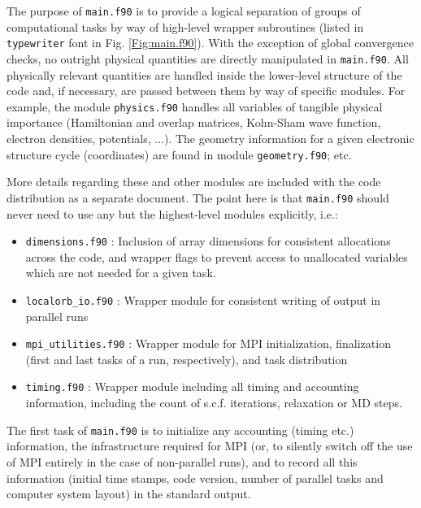 The purpose of \texttt{main.f90} is to provide a logical separation of
groups of computational tasks by way of high-level wrapper subroutines
(listed in \texttt{typewriter} font in Fig. \ref{Fig:main.f90}). With
the exception of global convergence checks, no outright physical
quantities are directly manipulated in \texttt{main.f90}. All
physically relevant quantities are handled inside the lower-level
structure of the code and, if necessary, are passed between them by
way of specific modules. For example, the module \texttt{physics.f90}
handles all variables of tangible physical importance (Hamiltonian and
overlap matrices, Kohn-Sham wave function, electron densities,
potentials, ...). The geometry information for a given electronic
structure cycle (coordinates) are found in module
\texttt{geometry.f90}; etc. 

More details regarding these and other
modules are included with the code distribution as a separate
document. The point here is that \texttt{main.f90} should never need
to use any but the highest-level modules explicitly, i.e.:
\begin{itemize}
  \item \texttt{dimensions.f90} : Inclusion of array dimensions
    for consistent allocations across the code, and wrapper flags to
    prevent access to unallocated variables which are not needed for a
    given task.
  \item \texttt{localorb\_io.f90} : Wrapper module for consistent
    writing of output in parallel runs
  \item \texttt{mpi\_utilities.f90} : Wrapper module for MPI
    initialization, finalization (first and last tasks of a run,
    respectively), and task distribution
  \item \texttt{timing.f90} : Wrapper module including all timing and
    accounting information, including the count of s.c.f. iterations,
    relaxation or MD steps.
\end{itemize}

The first task of \texttt{main.f90} is to initialize any accounting
(timing etc.) information, the infrastructure required for MPI (or, to
silently switch off the use of MPI entirely in the case of
non-parallel runs), and to record all this information (initial time
stamps, code version, number of parallel tasks and computer system
layout) in the standard output.

